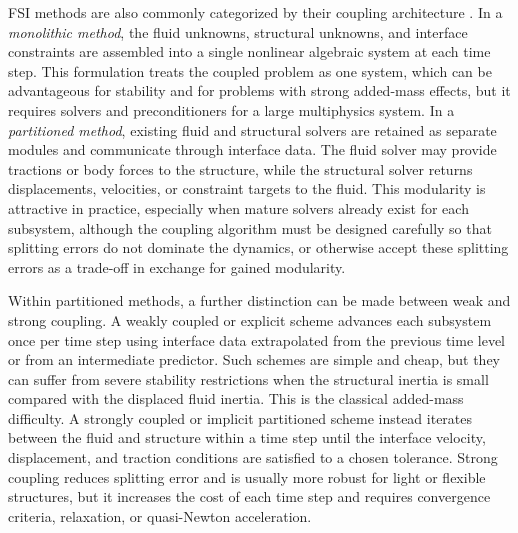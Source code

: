 FSI methods are also commonly categorized by their coupling architecture
\cite{hou_numerical_2012}. In a \emph{monolithic method}, the fluid unknowns,
structural unknowns, and interface constraints are assembled into a single
nonlinear algebraic system at each time step. This formulation treats the
coupled problem as one system, which can be advantageous for stability and for
problems with strong added-mass effects, but it requires solvers and
preconditioners for a large multiphysics system. In a \emph{partitioned
method}, existing fluid and structural solvers are retained as separate modules
and communicate through interface data. The fluid solver may provide tractions
or body forces to the structure, while the structural solver returns
displacements, velocities, or constraint targets to the fluid. This modularity
is attractive in practice, especially when mature solvers already exist for
each subsystem, although the coupling algorithm must be designed carefully so
that splitting errors do not dominate the dynamics, or otherwise accept these
splitting errors as a trade-off in exchange for gained modularity.

Within partitioned methods, a further distinction can be made between weak and
strong coupling. A weakly coupled or explicit scheme advances each subsystem
once per time step using interface data extrapolated from the previous time
level or from an intermediate predictor. Such schemes are simple and cheap, but
they can suffer from severe stability restrictions when the structural inertia
is small compared with the displaced fluid inertia. This is the classical
added-mass difficulty. A strongly coupled or implicit partitioned scheme
instead iterates between the fluid and structure within a time step until the
interface velocity, displacement, and traction conditions are satisfied to a
chosen tolerance. Strong coupling reduces splitting error and is usually more
robust for light or flexible structures, but it increases the cost of each time
step and requires convergence criteria, relaxation, or quasi-Newton
acceleration.

